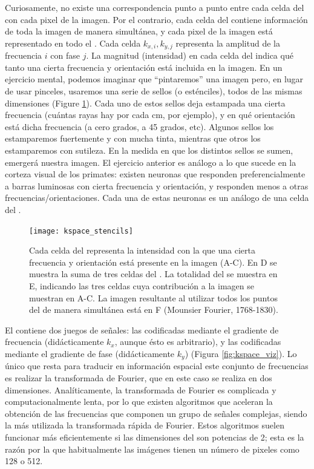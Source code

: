 Curiosamente, no existe una correspondencia punto a punto entre cada celda del \espaciok con cada pixel de la imagen. Por el contrario, cada celda del \espaciok contiene información de toda la imagen de manera simultánea, y cada pixel de la imagen está representado en todo el \espaciok. Cada celda $k_{x,i},k_{y,j}$ representa la amplitud de la frecuencia $i$ con fase $j$. La magnitud (intensidad) en cada celda del \espaciok indica qué tanto una cierta frecuencia y orientación está incluida en la imagen. En un ejercicio mental, podemos imaginar que ``pintaremos'' una imagen pero, en lugar de usar pinceles, usaremos una serie de sellos (o esténciles), todos de las mismas dimensiones (Figure \ref{fig:kspace_stencils}). Cada uno de estos sellos deja estampada una cierta frecuencia (cuántas rayas hay por cada cm, por ejemplo), y en qué orientación está dicha frecuencia (a cero grados, a 45 grados, etc). Algunos sellos los estamparemos fuertemente y con mucha tinta, mientras que otros los estamparemos con sutileza. En la medida en que los distintos sellos se sumen, emergerá nuestra imagen. El ejercicio anterior es análogo a lo que sucede en la corteza visual de los primates: existen neuronas que responden preferencialmente a barras luminosas con cierta frecuencia y orientación, y responden menos a otras frecuencias/orientaciones. Cada una de estas neuronas es un análogo de una celda del \espaciok.


\begin{figure}[htb]
\begin{figg}
   \texttt{[image: kspace\_stencils]}
   \caption{Cada celda del \espaciok representa la intensidad con la que una cierta frecuencia y orientación está presente en la imagen (A-C). En D se muestra la suma de tres celdas del \espaciok. La totalidad del \espaciok se muestra en E, indicando las tres celdas cuya contribución a la imagen se muestran en A-C. La imagen resultante al utilizar todos los puntos del \espaciok de manera simultánea está en F (Mounsier Fourier, 1768-1830). }
 \label{fig:kspace_stencils}
 \end{figg}
\end{figure}



El \espaciok contiene dos juegos de señales: las codificadas mediante el gradiente de frecuencia (didácticamente $k_x$, aunque ésto es arbitrario), y las codificadas mediante el gradiente de fase (didácticamente $k_y$) (Figura \ref{fig:kspace_viz}). Lo único que resta para traducir en información espacial este conjunto de frecuencias es realizar la transformada de Fourier, que en este caso se realiza en dos dimensiones. Analíticamente, la transformada de Fourier es complicada y computacionalmente lenta, por lo que existen algoritmos que aceleran la obtención de las frecuencias que componen un grupo de señales complejas, siendo la más utilizada la transformada rápida de Fourier. Estos algoritmos suelen funcionar más eficientemente si las dimensiones del \espaciok son potencias de 2; esta es la razón por la que habitualmente las imágenes tienen un número de pixeles como 128 o 512.


